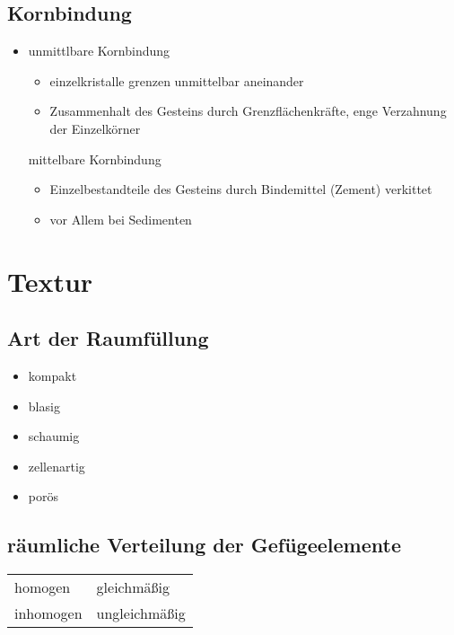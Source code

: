 \documentclass[a4, 12pt]{scrreprt}
\begin{document}
\section{Kornbindung}

\begin{itemize}
\item unmittlbare Kornbindung
\begin{itemize}
\item einzelkristalle grenzen unmittelbar aneinander
\item Zusammenhalt des Gesteins durch Grenzflächenkräfte, enge Verzahnung der Einzelkörner
\end{itemize}
mittelbare Kornbindung
\begin{itemize}
\item Einzelbestandteile des Gesteins durch Bindemittel (Zement) verkittet
\item vor Allem bei Sedimenten
\end{itemize}
\end{itemize}

\chapter{Textur}

\section{Art der Raumfüllung}

\begin{itemize}
\item kompakt
\item blasig
\item schaumig
\item zellenartig
\item porös
\end{itemize}

\section{räumliche Verteilung der Gefügeelemente}

\begin{center}
\begin{tabular}{ll}
homogen & gleichmäßig\\
inhomogen & ungleichmäßig\\
\end{tabular}
\end{center}
\end{document}
